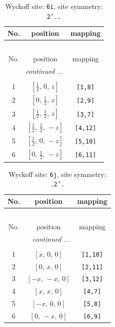 \documentclass[fleqn,8pt]{jsarticle}
\begin{document}
\renewcommand{\arraystretch}{1.2}
\begin{longtable}{ccc}
\caption{Wyckoff site: {\tt 6i}, site symmetry: {\tt 2'..}}
 \\
 \hline \hline
No. & position & mapping \\ \hline \endfirsthead

\multicolumn{2}{l}{\tablename\ \thetable{}} \\
 \hline \hline
No. & position & mapping \\ \hline \endhead

 \hline \hline
\multicolumn{2}{r}{\footnotesize\it continued ...} \\ \endfoot

 \hline \hline
\multicolumn{2}{r}{} \\ \endlastfoot

1 & $\left[ \frac{1}{2},\, 0,\, z \right]$ & {\tt [1,8]} \\ \hline
2 & $\left[ 0,\, \frac{1}{2},\, z \right]$ & {\tt [2,9]} \\ \hline
3 & $\left[ \frac{1}{2},\, \frac{1}{2},\, z \right]$ & {\tt [3,7]} \\ \hline
4 & $\left[ \frac{1}{2},\, \frac{1}{2},\, - z \right]$ & {\tt [4,12]} \\ \hline
5 & $\left[ \frac{1}{2},\, 0,\, - z \right]$ & {\tt [5,10]} \\ \hline
6 & $\left[ 0,\, \frac{1}{2},\, - z \right]$ & {\tt [6,11]} \\
\end{longtable}
\renewcommand{\arraystretch}{1.2}
\begin{longtable}{ccc}
\caption{Wyckoff site: {\tt 6j}, site symmetry: {\tt .2'.}}
 \\
 \hline \hline
No. & position & mapping \\ \hline \endfirsthead

\multicolumn{2}{l}{\tablename\ \thetable{}} \\
 \hline \hline
No. & position & mapping \\ \hline \endhead

 \hline \hline
\multicolumn{2}{r}{\footnotesize\it continued ...} \\ \endfoot

 \hline \hline
\multicolumn{2}{r}{} \\ \endlastfoot

1 & $\left[ x,\, 0,\, 0 \right]$ & {\tt [1,10]} \\ \hline
2 & $\left[ 0,\, x,\, 0 \right]$ & {\tt [2,11]} \\ \hline
3 & $\left[ - x,\, - x,\, 0 \right]$ & {\tt [3,12]} \\ \hline
4 & $\left[ x,\, x,\, 0 \right]$ & {\tt [4,7]} \\ \hline
5 & $\left[ - x,\, 0,\, 0 \right]$ & {\tt [5,8]} \\ \hline
6 & $\left[ 0,\, - x,\, 0 \right]$ & {\tt [6,9]} \\
\end{longtable}
\end{document}

